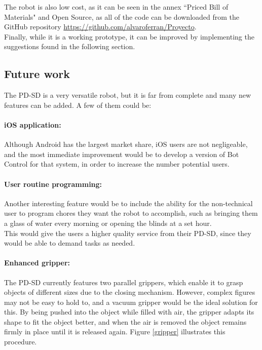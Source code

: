 The robot is also low cost, as it can be seen in the annex ``Priced Bill of Materials" and Open Source, as all of the code can be downloaded from the GitHub repository \url{https://github.com/alvaroferran/Proyecto}.\\

Finally, while it is a working prototype, it can be improved by implementing the suggestions found in the following section.





















\newpage
\subsection{Future work}

The PD-SD is a very versatile robot, but it is far from complete and many new features can be added. A few of them could be:

\paragraph{iOS application:} Although Android has the largest market share, iOS users are not negligeable, and the most immediate improvement would be to develop a version of Bot Control for that system, in order to increase the number potential users.

\paragraph{User routine programming:} Another interesting feature would be to include the ability for the non-technical user to program chores they want the robot to accomplish, such as bringing them a glass of water every morning or opening the blinds at a set hour. \\

This would give the users a higher quality service from their PD-SD, since they would be able to demand tasks as needed.



\paragraph{Enhanced gripper:}  The PD-SD currently features two parallel grippers, which enable it to grasp objects of different sizes due to the closing mechanism. However, complex figures may not be easy to hold to, and a vacuum gripper would be the ideal solution for this. By being pushed into the object while filled with air, the gripper adapts its shape to fit the object better, and when the air is removed the object remains firmly in place until it is released again. Figure \ref{gripper} illustrates this procedure.

